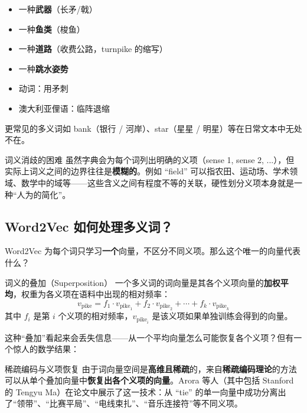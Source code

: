\documentclass[a4paper]{article}
\begin{document}
\begin{itemize}
    \item 一种\textbf{武器}（长矛/戟）
    \item 一种\textbf{鱼类}（梭鱼）
    \item 一种\textbf{道路}（收费公路，turnpike 的缩写）
    \item 一种\textbf{跳水姿势}
    \item 动词：用矛刺
    \item 澳大利亚俚语：临阵退缩
\end{itemize}

更常见的多义词如 bank（银行 / 河岸）、star（星星 / 明星）等在日常文本中无处不在。

\begin{warningbox}{词义消歧的困难}
虽然字典会为每个词列出明确的义项（sense 1, sense 2, ...），但实际上词义之间的边界往往是\textbf{模糊的}。例如 ``field'' 可以指农田、运动场、学术领域、数学中的域等——这些含义之间有程度不等的关联，硬性划分义项本身就是一种``人为的简化''。
\end{warningbox}

\subsection{Word2Vec 如何处理多义词？}

Word2Vec 为每个词只学习\textbf{一个}向量，不区分不同义项。那么这个唯一的向量代表什么？

\begin{importantbox}{词义的叠加（Superposition）}
一个多义词的词向量是其各个义项向量的\textbf{加权平均}，权重为各义项在语料中出现的相对频率：
$$v_{\text{pike}} = f_1 \cdot v_{\text{pike}_1} + f_2 \cdot v_{\text{pike}_2} + \cdots + f_k \cdot v_{\text{pike}_k}$$
其中 $f_i$ 是第 $i$ 个义项的相对频率，$v_{\text{pike}_i}$ 是该义项如果单独训练会得到的向量。
\end{importantbox}

这种``叠加''看起来会丢失信息——从一个平均向量怎么可能恢复各个义项？但有一个惊人的数学结果：

\begin{knowledgebox}{稀疏编码与义项恢复}
由于词向量空间是\textbf{高维且稀疏}的，来自\textbf{稀疏编码理论}的方法可以从单个叠加向量中\textbf{恢复出各个义项的向量}。Arora 等人（其中包括 Stanford 的 Tengyu Ma）在论文中展示了这一技术：从 ``tie'' 的单一向量中成功分离出了``领带''、``比赛平局''、``电线束扎''、``音乐连接符''等不同义项。
\end{knowledgebox}
\end{document}
